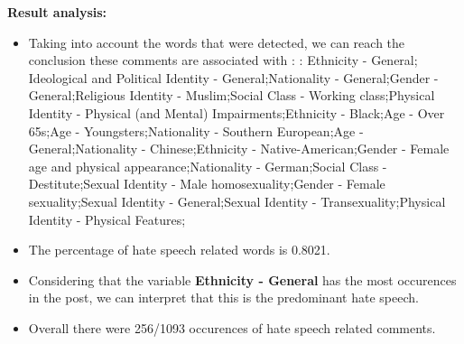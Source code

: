 \documentclass[11pt]{article}
\begin{document}
\textbf{\Large Result analysis:}

\begin{itemize}\item Taking into account the words that were detected, we can reach the conclusion these comments are associated with : : Ethnicity - General; Ideological and Political Identity - General;Nationality - General;Gender - General;Religious Identity - Muslim;Social Class - Working class;Physical Identity - Physical (and Mental) Impairments;Ethnicity - Black;Age - Over 65s;Age - Youngsters;Nationality - Southern European;Age - General;Nationality - Chinese;Ethnicity - Native-American;Gender - Female age and physical appearance;Nationality - German;Social Class - Destitute;Sexual Identity - Male homosexuality;Gender - Female sexuality;Sexual Identity - General;Sexual Identity - Transexuality;Physical Identity - Physical Features;%

\item The percentage of hate speech related words is 0.8021.

\item Considering that the variable \textbf{Ethnicity - General} has the most occurences in the post, we can interpret that this is the predominant hate speech.

\item Overall there were 256/1093 occurences of hate speech related comments.\end{itemize}
\end{document}
